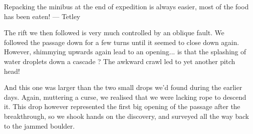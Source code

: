 \begin{marginfigure}
\label{packing the bus}
\caption{Repacking the minibus at the end of expedition is always easier, most of the food has been eaten!  --- Tetley}
\end{marginfigure}


The rift we then followed is very much controlled by an oblique fault. We followed the passage down for a few turns until it seemed to close down again. However, shimmying upwards again lead to an opening... is that the splashing of water droplets down a cascade ? The awkward crawl led to yet another pitch head!

And this one was larger than the two small drops we'd found during the earlier days. Again, muttering a curse, we realised that we were lacking rope to descend it. This drop however represented the first big opening of the passage after the breakthrough, so we shook hands on the discovery, and surveyed all the way back to the jammed boulder.

